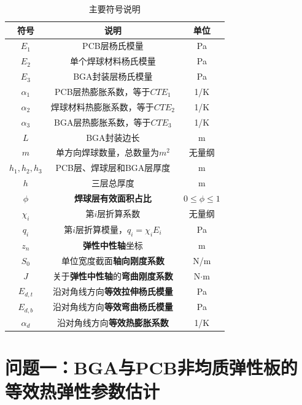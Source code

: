 \documentclass[draft,12pt,a4paper]{ctexart}
\theoremstyle{definition}
\begin{document}
\begin{table}[H]\centering
  \caption{主要符号说明}\label{tab:symbol}
  \small
  \begin{tabular}{ccc}
    \toprule
    \textbf{符号} & \textbf{说明} & \textbf{单位} \\
    \midrule
    $E_1$ & PCB层杨氏模量 & Pa \\
    $E_2$ & 单个焊球材料杨氏模量 & Pa \\
    $E_3$ & BGA封装层杨氏模量 & Pa \\
    $\alpha_1$ & PCB层热膨胀系数，等于$CTE_1$ & 1/K \\
    $\alpha_2$ & 焊球材料热膨胀系数，等于$CTE_2$ & 1/K \\
    $\alpha_3$ & BGA层热膨胀系数，等于$CTE_3$ & 1/K \\
    $L$ & BGA封装边长 & m \\
    $m$ & 单方向焊球数量，总数量为$m^2$ & 无量纲 \\
    $h_1,h_2,h_3$ & PCB层、焊球层和BGA层厚度 & m \\
    $h$ & 三层总厚度 & m \\
    $\phi$ & \textbf{焊球层有效面积占比} & $0 \leq \phi \leq 1$ \\
    $\chi_i$ & 第$i$层折算系数 & 无量纲 \\
    $q_i$ & 第$i$层折算模量，$q_i=\chi_i E_i$ & Pa \\
    $z_n$ & \textbf{弹性中性轴}坐标 & m \\
    $S_0$ & 单位宽度截面\textbf{轴向刚度系数} & N/m \\
    $J$ & 关于\textbf{弹性中性轴}的\textbf{弯曲刚度系数} & N$\cdot$m \\
    $E_{d,t}$ & 沿对角线方向\textbf{等效拉伸杨氏模量} & Pa \\
    $E_{d,b}$ & 沿对角线方向\textbf{等效弯曲杨氏模量} & Pa \\
    $\alpha_d$ & 沿对角线方向\textbf{等效热膨胀系数} & 1/K \\
    \bottomrule
  \end{tabular}
\end{table}

\section{问题一：BGA与PCB\textbf{非均质弹性板}的\textbf{等效热弹性参数}估计}
\end{document}
